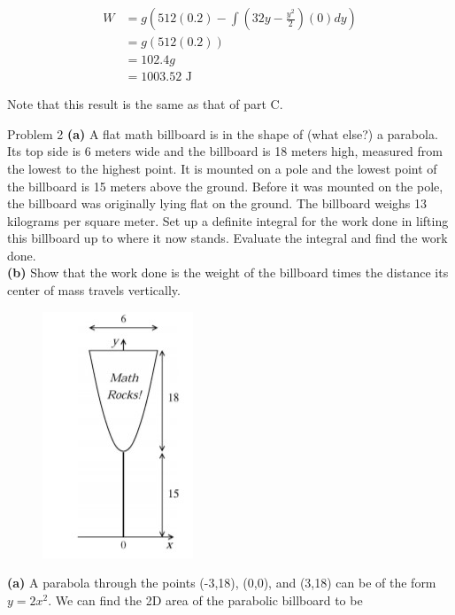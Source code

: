 \documentclass{article}
\begin{document}
    \begin{align*}
        W   &= g\left(512(0.2)-\int\left(32y-\frac{y^2}{2}\right)(0)dy\right) \\
            &= g(512(0.2)) \\
            &= 102.4g \\
            &= 1003.52 \text{ J}
    \end{align*}

    Note that this result is the same as that of part C.



    \begin{tbhtheorem}{Problem 2}
        \textbf{(a)} A flat math billboard is in the shape of (what else?) a parabola. Its top side is 6 meters wide and the billboard is 18 meters high, measured from the lowest to the highest point. It is mounted on a
        pole and the lowest point of the billboard is 15 meters above the ground. Before it was mounted on the pole, the billboard was originally lying flat on the ground. The billboard weighs 13 kilograms per square
        meter. Set up a definite integral for the work done in lifting this billboard up to where it now stands. Evaluate the integral and find the work done. \\
        \textbf{(b)} Show that the work done is the weight of the billboard times the distance its center of mass travels vertically.
    \end{tbhtheorem}
    
    \begin{figure}[hbt!]
        \centering
        \includegraphics[]{2D}
    \end{figure}

    \textbf{(a)}
    A parabola through the points (-3,18), (0,0), and (3,18) can be of the form $y=2x^2$. We can find the 2D area of the parabolic billboard to be
\end{document}
